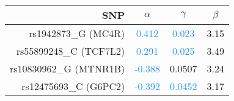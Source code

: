 \begin{tabular}{rccc}
  \hline
SNP & $\alpha$ & $\gamma$ & $\beta$ \\ 
  \hline
rs1942873\_G (MC4R) & \textcolor{dodgerblue}{0.412} & \textcolor{dodgerblue}{0.023} & \textcolor{firebrick2}{3.15} \\ 
  rs55899248\_C (TCF7L2) & \textcolor{dodgerblue}{0.291} & \textcolor{dodgerblue}{0.025} & \textcolor{firebrick2}{3.49} \\ 
  rs10830962\_G (MTNR1B) & \textcolor{dodgerblue}{-0.388} & \textcolor{firebrick2}{0.0507} & \textcolor{firebrick2}{3.24} \\ 
  rs12475693\_C (G6PC2) & \textcolor{dodgerblue}{-0.392} & \textcolor{dodgerblue}{0.0452} & \textcolor{firebrick2}{3.17} \\ 
   \hline
\end{tabular}
